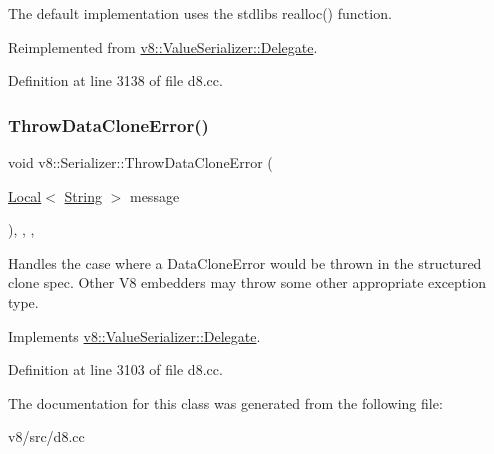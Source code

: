 The default implementation uses the stdlib\textquotesingle{}s {\ttfamily realloc()} function. 

Reimplemented from \mbox{\hyperlink{classv8_1_1ValueSerializer_1_1Delegate_ade3ce68ebf5a3f3eba2f8f091177f155}{v8\+::\+Value\+Serializer\+::\+Delegate}}.



Definition at line 3138 of file d8.\+cc.

\mbox{\label{classv8_1_1Serializer_a97707713e9bfe28e117bd15d40e3afc6}} 
\subsubsection{\texorpdfstring{Throw\+Data\+Clone\+Error()}{ThrowDataCloneError()}}
{\footnotesize\ttfamily void v8\+::\+Serializer\+::\+Throw\+Data\+Clone\+Error (\begin{DoxyParamCaption}\item[{\mbox{\hyperlink{classv8_1_1Local}{Local}}$<$ \mbox{\hyperlink{classv8_1_1String}{String}} $>$}]{message }\end{DoxyParamCaption})\hspace{0.3cm}{\ttfamily [inline]}, {\ttfamily [override]}, {\ttfamily [protected]}, {\ttfamily [virtual]}}

Handles the case where a Data\+Clone\+Error would be thrown in the structured clone spec. Other V8 embedders may throw some other appropriate exception type. 

Implements \mbox{\hyperlink{classv8_1_1ValueSerializer_1_1Delegate_a3681bfcd9a6c45f0b12bd7a8bdf34d85}{v8\+::\+Value\+Serializer\+::\+Delegate}}.



Definition at line 3103 of file d8.\+cc.



The documentation for this class was generated from the following file\+:\begin{DoxyCompactItemize}
\item 
v8/src/d8.\+cc\end{DoxyCompactItemize}
